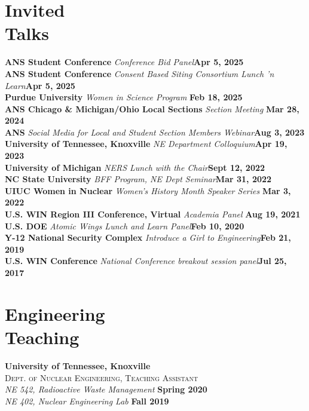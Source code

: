 \documentclass[margin,line]{resume}
\begin{document}
\begin{resume}
    \section{\mysidestyle Invited\\Talks}
    \textbf{ANS Student Conference} \textsl{Conference Bid Panel}\hfill \textbf{Apr 5, 2025}\\
    \textbf{ANS Student Conference} \textsl{Consent Based Siting Consortium Lunch 'n Learn}\hfill \textbf{Apr 5, 2025}\\
    \textbf{Purdue University} \textsl{Women in Science Program} \hfill \textbf{Feb 18, 2025}\\ 
    \textbf{ANS Chicago \& Michigan/Ohio Local Sections} \textsl{Section Meeting} \hfill\textbf{Mar 28, 2024}\\
    \textbf{ANS} \textsl{Social Media for Local and Student Section Members Webinar}\hfill \textbf{Aug 3, 2023}\\
    \textbf{University of Tennessee, Knoxville} \textsl{NE Department Colloquium}\hfill \textbf{Apr 19, 2023}\\
    \textbf{University of Michigan} \textsl{NERS Lunch with the Chair}\hfill \textbf{Sept 12, 2022}\\
    \textbf{NC State University} \textsl{BFF Program, NE Dept Seminar}\hfill\textbf{Mar 31, 2022}\\
    \textbf{UIUC Women in Nuclear} \textsl{Women's History Month Speaker Series} \hfill\textbf{Mar 3, 2022}\\
    \textbf{U.S. WIN Region III Conference, Virtual} \textsl{Academia Panel} \hfill \textbf{Aug 19, 2021}\\
    \textbf{U.S. DOE} \textsl{Atomic Wings Lunch and Learn Panel}\hfill \textbf{Feb 10, 2020} \\
    \textbf{Y-12 National Security Complex} \textsl{Introduce a Girl to Engineering}\hfill \textbf{Feb 21, 2019} \\
    \textbf{U.S. WIN Conference} \textsl{National Conference breakout session panel}\hfill \textbf{Jul 25, 2017}
    \section{\mysidestyle Engineering\\Teaching}
    \textbf{University of Tennessee, Knoxville}\\
    \textsc{Dept. of Nuclear Engineering, Teaching Assistant}\\
               \textsl{NE 542, Radioactive Waste Management} \hfill \textbf{Spring 2020}\\
               \textsl{NE 402, Nuclear Engineering Lab} \hfill \textbf{Fall 2019}
               \vspace{2mm}


\end{resume}
\end{document}
